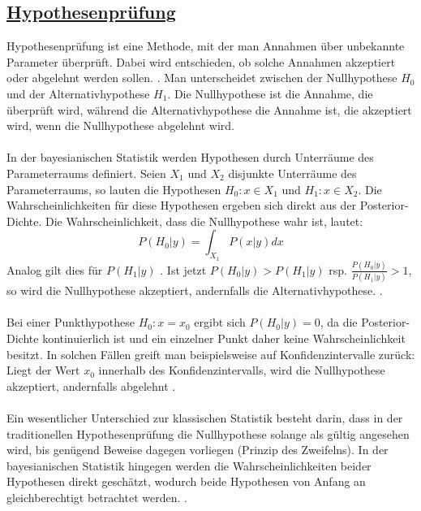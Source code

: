 \documentclass[a4paper,12pt]{article}
\begin{document}
\subsection*{\underline{Hypothesenprüfung}}
Hypothesenprüfung ist eine Methode, mit der man Annahmen über unbekannte Parameter überprüft. Dabei wird entschieden, ob solche Annahmen akzeptiert oder abgelehnt werden sollen. \parencite[74]{EinfBayesStatistik}. Man unterscheidet zwischen der Nullhypothese $H_0$ und der Alternativhypothese $H_1$. Die Nullhypothese ist die Annahme, die überprüft wird, während die Alternativhypothese die Annahme ist, die akzeptiert wird, wenn die Nullhypothese abgelehnt wird. \\\\
In der bayesianischen Statistik werden Hypothesen durch Unterräume des Parameterraums definiert. Seien $X_1$ und $X_2$ disjunkte Unterräume des Parameterraums, so lauten die Hypothesen $H_0: x \in X_1$ und $H_1: x \in X_2$. Die Wahrscheinlichkeiten für diese Hypothesen ergeben sich direkt aus der Posterior-Dichte. Die Wahrscheinlichkeit, dass die Nullhypothese wahr ist, lautet:
\begin{equation}
  P(H_0|y) = \int_{X_1} P(x|y) dx
\end{equation}
Analog gilt dies für $P(H_1|y)$ \parencite[74]{EinfBayesStatistik}. Ist jetzt $P(H_0|y) > P(H_1|y)$ rsp. $\frac{P(H_0|y)}{P(H_1|y)}>1$, so wird die Nullhypothese akzeptiert, andernfalls die Alternativhypothese. \parencite[77]{EinfBayesStatistik}. \\\\
Bei einer Punkthypothese $H_0: x = x_0$ ergibt sich $P(H_0|y) = 0$, da die Posterior-Dichte kontinuierlich ist und ein einzelner Punkt daher keine Wahrscheinlichkeit besitzt. In solchen Fällen greift man beispielsweise auf Konfidenzintervalle zurück: Liegt der Wert $x_0$ innerhalb des Konfidenzintervalls, wird die Nullhypothese akzeptiert, andernfalls abgelehnt \parencite[84]{EinfBayesStatistik}. \\\\
Ein wesentlicher Unterschied zur klassischen Statistik besteht darin, dass in der traditionellen Hypothesenprüfung die Nullhypothese solange als gültig angesehen wird, bis genügend Beweise dagegen vorliegen (Prinzip des Zweifelns). In der bayesianischen Statistik hingegen werden die Wahrscheinlichkeiten beider Hypothesen direkt geschätzt, wodurch beide Hypothesen von Anfang an gleichberechtigt betrachtet werden. \parencite[83]{EinfBayesStatistik}.


\newpage
\end{document}
